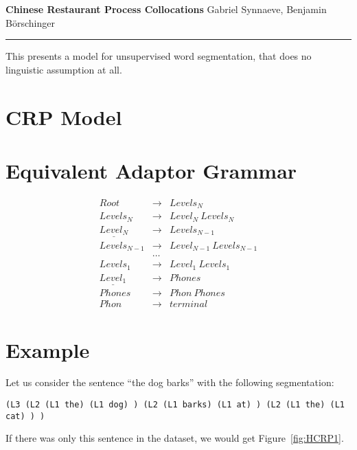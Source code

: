 \documentclass[a4paper,12pt]{article}
\begin{document}
\begin{center}
{\fontsize{20pt}{20pt} \selectfont \textbf{Chinese Restaurant Process Collocations}}
\vskip 10pt
Gabriel Synnaeve, Benjamin B\"{o}rschinger
\vskip 10pt
\hrule height 4pt
\end{center}

This presents a model for unsupervised word segmentation, that does no linguistic assumption at all.

\section{CRP Model}


\section{Equivalent Adaptor Grammar}
\begin{eqnarray}
    Root & \rightarrow & Levels_N\\
    Levels_N & \rightarrow & Level_N\ Levels_N\\
    \underline{Level_N} & \rightarrow & Levels_{N-1}\\
    Levels_{N-1} & \rightarrow & Level_{N-1}\ Levels_{N-1}\\
    & \dots & \\
    Levels_1 & \rightarrow & Level_1\ Levels_1\\
    \underline{Level_1} & \rightarrow & Phones\\
    Phones & \rightarrow & Phon\ Phones\\
    Phon & \rightarrow & terminal
\end{eqnarray}

\section{Example}

Let us consider the sentence ``the dog barks'' with the following segmentation:\\
\begin{small}
\texttt{(L3 (L2 (L1 the) (L1 dog) ) (L2 (L1 barks) (L1 at) ) (L2 (L1 the) (L1 cat) ) )}
\end{small}

If there was only this sentence in the dataset, we would get Figure~\ref{fig:HCRP1}.
\end{document}
